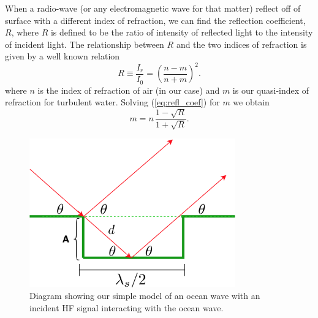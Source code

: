 \documentclass[11pt]{article}
\numberwithin{equation}{section}
\begin{document}
When a radio-wave (or any electromagnetic wave for that matter) reflect off of surface with a different index of refraction, we can find the reflection coefficient, $R$, where $R$ is defined to be the ratio of intensity of reflected light to the intensity of incident light. The relationship between $R$ and the two indices of refraction is given by a well known relation\cite{jackson1999classical,griffiths2005introduction}
\begin{equation}
    R \equiv \frac{I_r}{I_0} = \left(\frac{n-m}{n+m}\right)^2.
    \label{eq:refl_coef}
\end{equation}
where $n$ is the index of refraction of air (in our case) and $m$ is our quasi-index of refraction for turbulent water. Solving (\ref{eq:refl_coef}) for $m$ we obtain
\begin{equation}
    m = n \, \frac{1 - \sqrt R}{1+\sqrt{R}}.
    \label{eq:quasi_index}
\end{equation}

\begin{figure}[ht]
 \begin{center}
     \includegraphics[width = 3.5in]{figs/ocean.png}
 \end{center}
 \caption{Diagram showing our simple model of an ocean wave with an incident HF signal interacting with the ocean wave.}
 \label{fig:ocean}
\end{figure}
\end{document}
